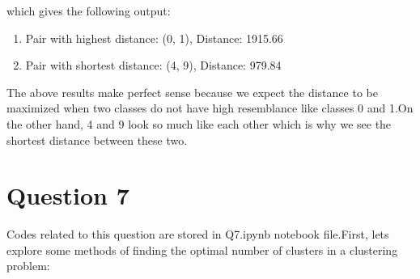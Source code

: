 \documentclass{article}
\begin{document}
which gives the following output:

\begin{enumerate}
    \item Pair with highest distance: (0, 1), Distance: 1915.66
    \item Pair with shortest distance: (4, 9), Distance: 979.84
\end{enumerate}

The above results make perfect sense because we expect the distance to be maximized when two classes do not have high resemblance like classes
0 and 1.On the other hand, 4 and 9 look so much like each other which is why we see the shortest distance between these two.

\section*{Question 7}
Codes related to this question are stored in Q7.ipynb notebook file.First, lets explore some methods of finding the optimal number of clusters
in a clustering problem:
\end{document}
